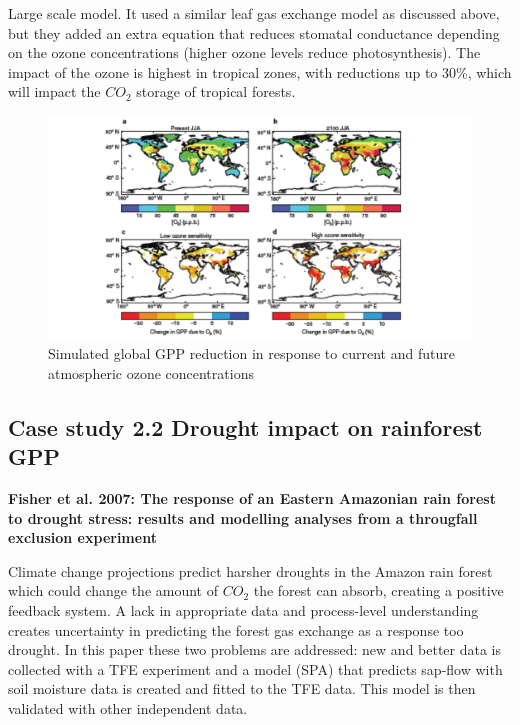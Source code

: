 \documentclass[12pt,oneside]{book}
\begin{document}
Large scale model. It used a similar leaf gas exchange model as
discussed above, but they added an extra equation that reduces stomatal
conductance depending on the ozone concentrations (higher ozone levels
reduce photosynthesis). The impact of the ozone is highest in tropical
zones, with reductions up to 30\%, which will impact the \(CO_2\)
storage of tropical forests.

\begin{figure}

{\centering \includegraphics[width=0.8\linewidth]{figures/chap2/ozone} 

}

\caption{Simulated global GPP reduction in response to current and future atmospheric ozone concentrations}\label{fig:f223}
\end{figure}

\subsection{Case study 2.2 Drought impact on rainforest
GPP}\label{case-study-2.2-drought-impact-on-rainforest-gpp}

\textbf{Fisher et al. 2007: The response of an Eastern Amazonian rain
forest to drought stress: results and modelling analyses from a
througfall exclusion experiment }

Climate change projections predict harsher droughts in the Amazon rain
forest which could change the amount of \(CO_2\) the forest can absorb,
creating a positive feedback system. A lack in appropriate data and
process-level understanding creates uncertainty in predicting the forest
gas exchange as a response too drought. In this paper these two problems
are addressed: new and better data is collected with a TFE experiment
and a model (SPA) that predicts sap-flow with soil moisture data is
created and fitted to the TFE data. This model is then validated with
other independent data.
\end{document}
